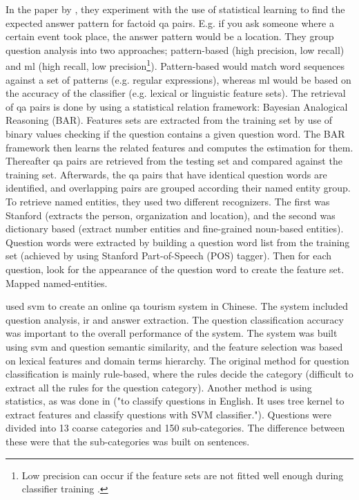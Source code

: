 In the paper by \citet{Toba2011}, they experiment with the use of statistical learning to find the expected answer pattern for factoid \gls{qa} pairs. 
E.g. if you ask someone where a certain event took place, the answer pattern would be a location. 
They group question analysis into two approaches; pattern-based (high precision, low recall) and \gls{ml} (high recall, 
low precision\footnote{
	Low precision can occur if the feature sets are not fitted well enough during classifier training 
	\cite[p.~283]{Toba2011}.
	}). 
Pattern-based would match word sequences against a set of patterns (e.g. regular expressions), whereas \gls{ml} would be based on the accuracy of the classifier 
(e.g. lexical or linguistic feature sets). 
The retrieval of \gls{qa} pairs is done by using a statistical relation framework: Bayesian Analogical Reasoning (BAR). 
Features sets are extracted from the training set by use of binary values checking if the question contains a given question word. 
The BAR framework then learns the related features and computes the estimation for them. 
Thereafter \gls{qa} pairs are retrieved from the testing set and compared against the training set. 
Afterwards, the \gls{qa} pairs that have identical question words are identified, and overlapping pairs are grouped according their named entity group.
To retrieve named entities, they used two different recognizers. 
The first was Stanford (extracts the person, organization and location), and the second was dictionary based (extract number entities and fine-grained noun-based entities). 
Question words were extracted by building a question word list from the training set (achieved by using Stanford Part-of-Speech (POS) tagger). 
Then for each question, look for the appearance of the question word to create the feature set.
Mapped named-entities.
\cite{Toba2011}



\citet{Xu2012} used \gls{svm} to create an online \gls{qa} tourism system in Chinese. 
The system included question analysis, \gls{ir} and answer extraction. 
The question classification accuracy was important to the overall performance of the system. 
The system was built using \gls{svm} and question semantic similarity, and the feature selection was based on lexical features and domain terms hierarchy. 
The original method for question classification is mainly rule-based, where the rules decide the category (difficult to extract all the rules for the question category). 
Another method is using statistics, as was done in \cite{Zhang2003} ("to classify questions in English. It uses tree kernel to extract features and classify questions with SVM classifier."). 
Questions were divided into 13 coarse categories and 150 sub-categories. 
The difference between these were that the sub-categories was built on sentences.
\citet{Xu2012}


